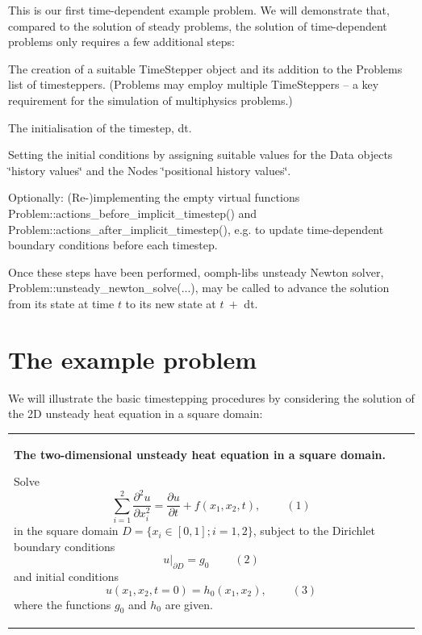 This is our first time-\/dependent example problem. We will demonstrate that, compared to the solution of steady problems, the solution of time-\/dependent problems only requires a few additional steps\+:
\begin{DoxyItemize}
\item The creation of a suitable {\ttfamily Time\+Stepper} object and its addition to the {\ttfamily Problem\textquotesingle{}s} list of timesteppers. ({\ttfamily Problems} may employ multiple {\ttfamily Time\+Steppers} -- a key requirement for the simulation of multiphysics problems.)
\item The initialisation of the timestep, {\ttfamily dt}.
\item Setting the initial conditions by assigning suitable values for the {\ttfamily Data} objects\textquotesingle{} \char`\"{}history values\char`\"{} and the {\ttfamily Nodes\textquotesingle{}} \char`\"{}positional
  history values\char`\"{}.
\item Optionally\+: (Re-\/)implementing the empty virtual functions {\ttfamily Problem\+::actions\+\_\+before\+\_\+implicit\+\_\+timestep()} and {\ttfamily Problem\+::actions\+\_\+after\+\_\+implicit\+\_\+timestep()}, e.\+g. to update time-\/dependent boundary conditions before each timestep.
\end{DoxyItemize}Once these steps have been performed, {\ttfamily oomph-\/lib\textquotesingle{}s} unsteady Newton solver, {\ttfamily Problem\+::unsteady\+\_\+newton\+\_\+solve}(...), may be called to advance the solution from its state at time $ t $ to its new state at $ t \ + $ {\ttfamily dt}.



 

\hypertarget{index_example}{}\section{The example problem}\label{index_example}
We will illustrate the basic timestepping procedures by considering the solution of the 2D unsteady heat equation in a square domain\+:

\begin{center} \tabulinesep=1mm
\begin{longtabu} spread 0pt [c]{*{1}{|X[-1]}|}
\hline
\begin{center} {\bfseries The two-\/dimensional unsteady heat equation in a square domain.} \end{center}  Solve \[ \sum_{i=1}^2\frac{\partial^2 u}{\partial x_i^2} = \frac{\partial u}{\partial t} + f\left(x_1,x_2,t\right), \ \ \ \ \ \ \ \ \ \ (1) \] in the square domain $ D = \{x_i \in [0,1]; i=1,2 \} $, subject to the Dirichlet boundary conditions \[ \left. u\right|_{\partial D}=g_0 \ \ \ \ \ \ \ \ \ \ (2) \] and initial conditions \[ u(x_1,x_2,t=0)=h_0(x_1,x_2), \ \ \ \ \ \ \ \ \ \ (3) \] where the functions $ g_0 $ and $ h_0 $ are given.   \\
\end{longtabu}
\end{center} 


